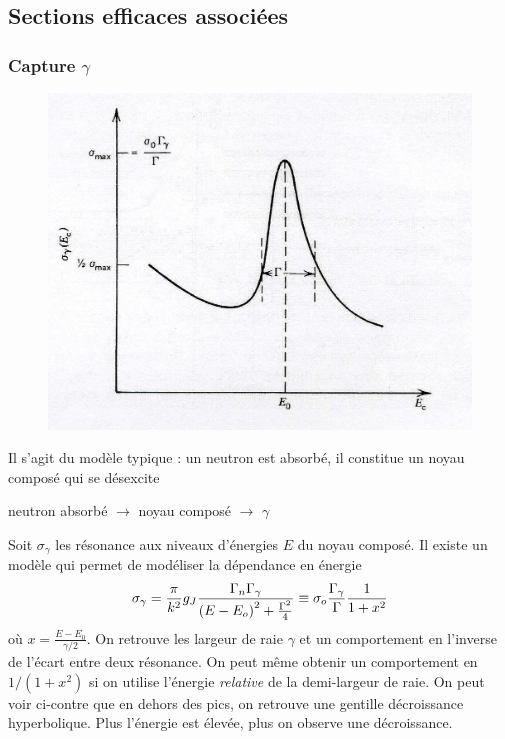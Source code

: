 \subsection{Sections efficaces associées}
\subsubsection{Capture $\gamma$}
	\begin{figure}
	\vspace{-5mm}
	\includegraphics[scale=0.23]{ch1/image9.png}
	\end{figure}
Il s'agit du modèle typique : un neutron est absorbé, il constitue un noyau composé qui se 
désexcite
\begin{center}
neutron absorbé $\longrightarrow$ noyau composé $\longrightarrow$ $\gamma$
\end{center}
Soit $\sigma_\gamma$ les résonance aux niveaux d'énergies $E$ du noyau composé. Il existe un 
modèle qui permet de modéliser la dépendance en énergie
\begin{equation}
{\sigma _\gamma } = \frac{\pi }{{{k^2}}}{g_J}\frac{{{\Gamma _n}{\Gamma _\gamma }}}{{{{(E - {E_o})}^2} + {\textstyle{{{\Gamma ^2}} \over 4}}}} \equiv {\sigma _o}\frac{{{\Gamma _\gamma }}}{\Gamma }\frac{1}{{1 + {x^2}}}
\end{equation}
où $x= \frac{E-E_0}{\gamma/2}$. On retrouve les largeur de raie $\gamma$ et un comportement en 
l'inverse de l'écart entre deux résonance. On peut même obtenir un comportement en $1/(1+x^2)$ si 
on utilise l'énergie \textit{relative} de la demi-largeur de raie. On peut voir ci-contre que 
en dehors des pics, on retrouve une gentille décroissance hyperbolique. Plus l'énergie est élevée, 
plus on observe une décroissance.

